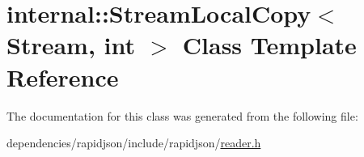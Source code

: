 \hypertarget{classinternal_1_1_stream_local_copy}{}\section{internal\+:\+:Stream\+Local\+Copy$<$ Stream, int $>$ Class Template Reference}
\label{classinternal_1_1_stream_local_copy}


The documentation for this class was generated from the following file\+:\begin{DoxyCompactItemize}
\item 
dependencies/rapidjson/include/rapidjson/\hyperlink{reader_8h}{reader.\+h}\end{DoxyCompactItemize}
